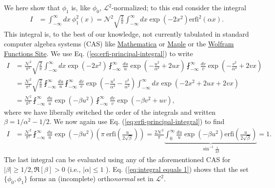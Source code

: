 \documentclass[english,12pt]{shreyasnotes}
\newcommand{\eq}[1]{\begin{align}#1\end{align}}
\newcommand{\erfi}{\text{erfi}}
\begin{document}
We here show that $\phi_1$ is, like $\phi_0$, $\mathcal{L}^2$-normalized; to this end consider the integral
\eq{
  I&=\int_{-\infty}^\infty dx \ \phi_1^2\left(x\right) =\mathcal{N}^2\sqrt{\frac{2}{\pi}}\int_{-\infty}^\infty dx  \exp\left(-2x^2\right)\erfi^2\left(\alpha x\right).
}
This integral is, to the best of our knowledge, not currently tabulated in standard computer algebra systems (CAS) like \href{http://www.wolfram.com/mathematica/}{Mathematica} or \href{http://www.maplesoft.com/}{Maple} or the \href{http://functions.wolfram.com/GammaBetaErf/Erfi/}{Wolfram Functions Site}. 
We use Eq. (\ref{eq:erfi-principal-integral}) to write
\begin{subequations}
\eq{
  I&=\frac{\mathcal{N}^2}{\pi^2}\sqrt{\frac{2}{\pi}}\int_{-\infty}^\infty dx\exp\left(-2x^2\right)\fint_{-\infty}^\infty \frac{du}{u} \exp\left(-\frac{u^2}{\alpha^2}+2ux\right)\fint_{-\infty}^\infty \frac{dv}{v} \exp\left(-\frac{v^2}{\alpha^2}+2vx\right)\\
  &=\frac{\mathcal{N}^2}{\pi^2}\sqrt{\frac{2}{\pi}}\fint_{-\infty}^\infty \frac{du}{u}\fint_{-\infty}^\infty \frac{dv}{v}
  \exp\left(-\frac{u^2}{\alpha^2}-\frac{v^2}{\alpha^2}\right) \int_{-\infty}^\infty dx \exp\left(-2x^2+2ux+2vx\right)\\
  &=\frac{\mathcal{N}^2}{\pi^2}\fint_{-\infty}^\infty \frac{du}{u}\exp\left(-\beta u^2\right)\fint_{-\infty}^\infty \frac{dv}{v}
  \exp\left(-\beta v^2+uv\right),
}
\end{subequations}
where we have liberally switched the order of the integrals and written $\beta=1/\alpha^2-1/2$. We now again use Eq. (\ref{eq:erfi-principal-integral}) to find
\eq{
  I&=\frac{\mathcal{N}^2}{\pi^2}\fint_{-\infty}^\infty \frac{du}{u}\exp\left(-\beta u^2\right)\left(\pi \ \erfi\left(\frac{u}{2\sqrt{\beta}}\right)\right)
  =\frac{2\mathcal{N}^2}{\pi}\underbrace{\int_{0}^\infty \frac{du}{u}\exp\left(-\beta u^2\right)\erfi\left(\frac{u}{2\sqrt{\beta}}\right)}_{\sin^{-1}\frac{1}{2\beta}}
  =1.
  \label{eq:integral equals 1}
}
The last integral can be evaluated using any of the aforementioned CAS for $\left|\beta\right|\geq1/2,\Re\left[\beta\right]>0$ (i.e., $\left|\alpha\right|\leq 1$%
). Eq. (\ref{eq:integral equals 1}) shows that the set $\{\phi_0,\phi_1 \}$ forms an (incomplete) ortho\emph{normal} set in $\mathcal{L}^2$.
\end{document}

